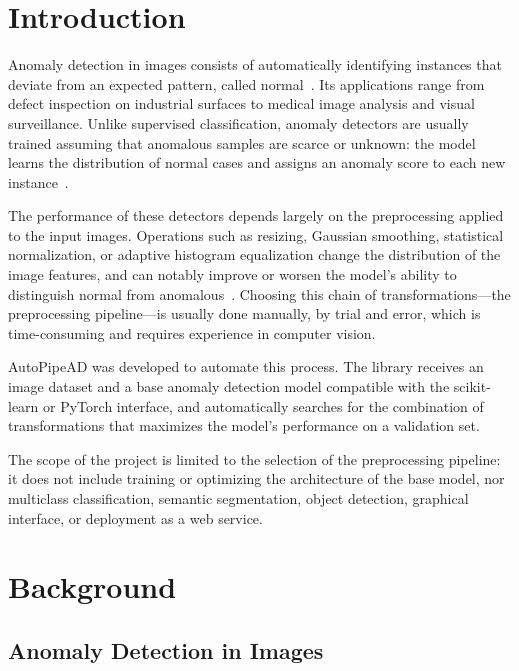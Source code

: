 \documentclass[conference]{IEEEtran}
\begin{document}
\section{Introduction}

Anomaly detection in images consists of automatically identifying instances
that deviate from an expected pattern, called normal~\cite{chandola2009anomaly}.
Its applications range from defect inspection on industrial surfaces to
medical image analysis and visual surveillance. Unlike supervised
classification, anomaly detectors are usually trained assuming that anomalous
samples are scarce or unknown: the model learns the distribution of normal
cases and assigns an anomaly score to each new
instance~\cite{chandola2009anomaly}.

The performance of these detectors depends largely on the preprocessing
applied to the input images. Operations such as resizing, Gaussian smoothing,
statistical normalization, or adaptive histogram equalization change the
distribution of the image features, and can notably improve or worsen the
model's ability to distinguish normal from anomalous~\cite{gonzalez2018dip}.
Choosing this chain of transformations—the preprocessing pipeline—is usually
done manually, by trial and error, which is time-consuming and requires
experience in computer vision.

AutoPipeAD was developed to automate this process. The library receives an
image dataset and a base anomaly detection model compatible with the
scikit-learn or PyTorch interface, and automatically searches for the
combination of transformations that maximizes the model's performance on a
validation set.

The scope of the project is limited to the selection of the preprocessing
pipeline: it does not include training or optimizing the architecture of the
base model, nor multiclass classification, semantic segmentation, object
detection, graphical interface, or deployment as a web service.

\section{Background}

\subsection{Anomaly Detection in Images}
\end{document}
